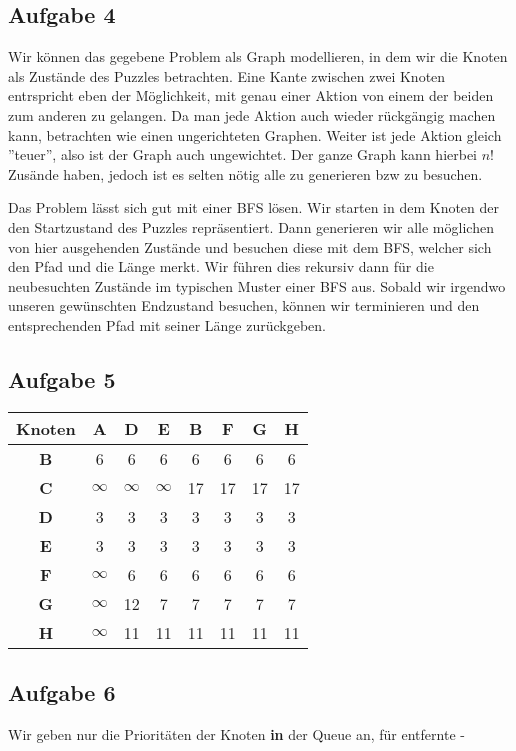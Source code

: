 \documentclass[a4paper,graphics,11pt]{article}
\newcommand{\aufgabe}[1]{\subsection*{Aufgabe #1}}
\begin{document}
\newpage

\aufgabe{4}
Wir können das gegebene Problem als Graph modellieren, in dem wir die Knoten als Zustände des Puzzles betrachten. Eine Kante
zwischen zwei Knoten entrspricht eben der Möglichkeit, mit genau einer Aktion von einem der beiden zum anderen zu gelangen.
Da man jede Aktion auch wieder rückgängig machen kann, betrachten wie einen ungerichteten Graphen. Weiter ist jede Aktion
gleich ''teuer'', also ist der Graph auch ungewichtet. Der ganze Graph kann hierbei $n!$ Zusände haben, jedoch ist es selten
nötig alle zu generieren bzw zu besuchen.

Das Problem lässt sich gut mit einer BFS lösen. Wir starten in dem Knoten der den Startzustand des Puzzles repräsentiert.
Dann generieren wir alle möglichen von hier ausgehenden Zustände und besuchen diese mit dem BFS, welcher sich den Pfad und die
Länge merkt. Wir führen dies rekursiv dann für die neubesuchten Zustände im typischen Muster einer BFS aus. Sobald wir irgendwo unseren gewünschten Endzustand besuchen, können wir terminieren und den entsprechenden Pfad
mit seiner Länge zurückgeben.

\aufgabe{5}

\begin{tabular}{c|c|c|c|c|c|c|c}
    \textbf{Knoten} & A & D & E & B & F& G& H\\
    \hline
    \textbf{B} & 6 & 6 & 6 & 6 & 6 & 6 & 6\\
    \hline
    \textbf{C} & $\infty$ & $\infty$ & $\infty$ & 17 & 17 & 17 & 17\\
    \hline
    \textbf{D} & 3 & 3 & 3 & 3 & 3 & 3 & 3\\
    \hline
    \textbf{E} & 3 & 3 & 3 & 3 & 3 & 3 & 3\\
    \hline
    \textbf{F} & $\infty$ & 6 & 6 & 6 & 6 & 6 & 6\\
    \hline
    \textbf{G} & $\infty$ & 12 & 7 & 7 & 7 & 7 & 7\\
    \hline
    \textbf{H} & $\infty$ & 11 & 11 & 11 & 11 & 11 & 11\\
\end{tabular}

\aufgabe{6}

Wir geben nur die Prioritäten der Knoten \textbf{in} der Queue an, für entfernte -
\end{document}
